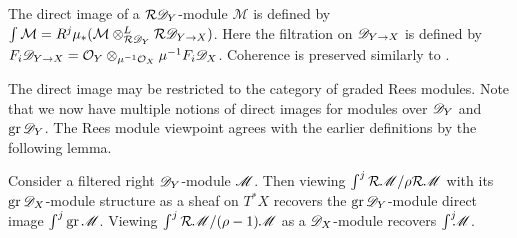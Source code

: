 The direct image of a $\mathcal{R}\mathscr{D}_Y$-module $\mathcal{M}$ is defined by $\int \mathcal{M} = R^j\mu_*(\mathcal{M}\otimes^L_{\mathcal{R} \mathscr{D}_Y} \mathcal{R} \mathscr{D}_{Y\to X})$.
Here the filtration on $\mathscr{D}_{Y\to X}$ is defined by $F_i\mathscr{D}_{Y\to X} =\mathcal{O}_{Y} \otimes_{\mu^{-1}\mathcal{O}_X}\mu^{-1}F_i\mathscr{D}_X $.
Coherence is preserved similarly to .

The direct image may be restricted to the category of graded Rees modules.
Note that we now have multiple notions of direct images for modules over $\mathscr{D}_Y$ and $\operatorname{gr}\mathscr{D}_Y$.
The Rees module viewpoint agrees with the earlier definitions by the following lemma.
\begin{lemma}\label{lem: ReesAndOtherDirectImagesAgree}
  Consider a filtered right $\mathscr{D}_Y$-module $\mathscr{M}$.
  Then viewing $\int^j \mathcal{R}\mathscr{M} / \rho\mathcal{R}\mathscr{M}$ with its $\operatorname{gr}\mathscr{D}_X$-module structure as a sheaf on $T^*X$ recovers the $\operatorname{gr}\mathscr{D}_Y$-module direct image $\int^j \operatorname{gr}\mathscr{M}$.
  Viewing  $\int^j \mathcal{R}\mathscr{M} / (\rho-1)\mathscr{M}$ as a $\mathscr{D}_X$-module recovers $\int^j \mkern -8mu \mathscr{M}$.
\end{lemma}

